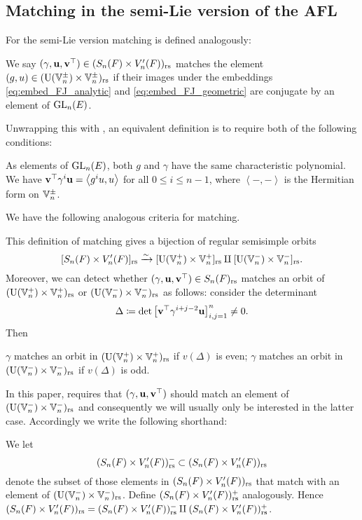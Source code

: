 \subsection{Matching in the semi-Lie version of the AFL}
For the semi-Lie version matching is defined analogously:
\begin{definition}
  We say $(\gamma, \mathbf u, \mathbf v^\top) \in (S_n(F) \times V'_n(F))_{\mathrm{rs}}$
  matches the element $(g, u) \in (\operatorname{U}(\mathbb V_n^\pm) \times \mathbb V_n^\pm)_{\mathrm{rs}}$ if
  their images under the embeddings \eqref{eq:embed_FJ_analytic}
  and \eqref{eq:embed_FJ_geometric} are conjugate by an element of $\operatorname{GL}_n(E)$.

  Unwrapping this with ,
  an equivalent definition is to require both of the following conditions:
  \begin{itemize}
    \ii As elements of $\operatorname{GL}_n(E)$,
    both $g$ and $\gamma$ have the same characteristic polynomial.
    \ii We have $\mathbf v^\top \gamma^i \mathbf u = \left< g^i u, u \right>$ for all $0 \le i \le n-1$,
    where $\left< -,- \right>$ is the Hermitian form on $\mathbb V_n^\pm$.
  \end{itemize}
  \label{def:matching_semi_lie}
\end{definition}
We have the following analogous criteria for matching.
\begin{proposition}
  \label{prop:valuation_delta_matching_semilie}
  This definition of matching gives a bijection of regular semisimple orbits
  \[ [S_n(F) \times V'_n(F)]_{\mathrm{rs}} \xrightarrow{\sim} [\operatorname{U}(\mathbb V_n^+) \times \mathbb V_n^+]_{\mathrm{rs}} \amalg [\operatorname{U}(\mathbb V_n^-) \times \mathbb V_n^-]_{\mathrm{rs}}. \]
  Moreover, we can detect whether ${(\gamma, \mathbf u, \mathbf v^\top)} \in S_n(F)_{\mathrm{rs}}$ matches an orbit of
  $(\operatorname{U}(\mathbb V_n^+) \times \mathbb V_n^+)_{\mathrm{rs}}$ or $(\operatorname{U}(\mathbb V_n^-) \times \mathbb V_n^-)_{\mathrm{rs}}$ as follows:
  consider the determinant
  \[ \Delta \coloneqq \det \left[ \mathbf v^\top \gamma^{i+j-2} \mathbf u \right]_{i,j=1}^n \neq 0. \]
  Then
  \begin{itemize}
    \ii $\gamma$ matches an orbit in $(\operatorname{U}(\mathbb V_n^+) \times \mathbb V_n^+)_{\mathrm{rs}}$ if $v(\Delta)$ is even;
    \ii $\gamma$ matches an orbit in $(\operatorname{U}(\mathbb V_n^-) \times \mathbb V_n^-)_{\mathrm{rs}}$ if $v(\Delta)$ is odd.
  \end{itemize}
\end{proposition}
In this paper, 
requires that ${(\gamma, \mathbf u, \mathbf v^\top)}$ should match an element of $(\operatorname{U}(\mathbb V_n^-) \times \mathbb V_n^-)_{\mathrm{rs}}$
and consequently we will usually only be interested in the latter case.
Accordingly we write the following shorthand:
\begin{definition}
  [$(S_n(F) \times V'_n(F))\rs^\pm$]
  We let \[ (S_n(F) \times V'_n(F))_{\mathrm{rs}}^- \subset (S_n(F) \times V'_n(F))_{\mathrm{rs}}  \]
  denote the subset of those elements in $(S_n(F) \times V'_n(F))_{\mathrm{rs}}$ that match
  with an element of $(\operatorname{U}(\mathbb V_n^-) \times \mathbb V_n^-)_{\mathrm{rs}}$.
  Define $(S_n(F) \times V'_n(F))_{\mathrm{rs}}^+$ analogously.
  Hence $(S_n(F) \times V'_n(F))_{\mathrm{rs}} = (S_n(F) \times V'_n(F))_{\mathrm{rs}}^- \amalg (S_n(F) \times V'_n(F))_{\mathrm{rs}}^+$.
\end{definition}
